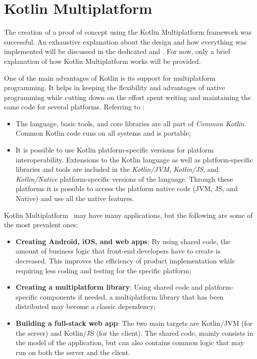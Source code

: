 \section{Kotlin Multiplatform}
\label{sec:kotlin-multiplatform}

\begin{info}[Anticipation:]
	The creation of a proof of concept using the Kotlin Multiplatform framework was successful. An exhaustive explanation about the design and how everything was implemented will be discussed in the dedicated  and . For now, only a brief explanation of how Kotlin Multiplatform works will be provided.
\end{info}

One of the main advantages of Kotlin is its support for multiplatform programming. It helps in keeping the flexibility and advantages of native programming while cutting down on the effort spent writing and maintaining the same code for several platforms. Referring to :


\begin{itemize}
	\item The language, basic tools, and core libraries are all part of \emph{Common Kotlin}. Common Kotlin code runs on all systems and is portable;
	\item It is possible to use Kotlin platform-specific versions for platform interoperability. Extensions to the Kotlin language as well as platform-specific libraries and tools are included in the \emph{Kotlin/JVM}, \emph{Kotlin/JS}, and \emph{Kotlin/Native} platform-specific versions of the language. Through these platforms it is possible to access the platform native code (JVM, JS, and Native) and use all the native features.
\end{itemize}

Kotlin Multiplatform~\cite{KotlinMu7:online} may have many applications, but the following are some of the most prevalent ones:

\begin{itemize}
	\item \textbf{Creating Android, iOS, and web apps}: By using shared code, the amount of business logic that front-end developers have to create is decreased. This improves the efficiency of product implementation while requiring less coding and testing for the specific platform;
	\item \textbf{Creating a multiplatform library}: Using shared code and platform-specific components if needed, a multiplatform library that has been distributed may become a classic dependency;
	\item \textbf{Building a full-stack web app}: The two main targets are Kotlin/JVM (for the server) and Kotlin/JS (for the client). The shared code, mainly consists in the model of the application, but can also contains common logic that may run on both the server and the client.
\end{itemize}

